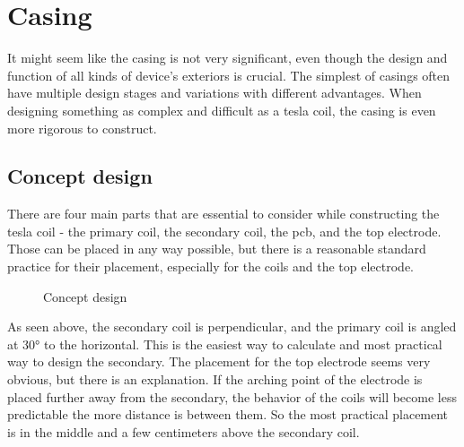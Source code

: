 \chapter{Casing}


It might seem like the casing is not very significant, even though the design and function of all kinds of device's exteriors is crucial. The simplest of casings often have multiple design stages and variations with different advantages. When designing something as complex and difficult as a tesla coil, the casing is even more rigorous to construct. 


\section{Concept design}
\label{sec:concept-design}

There are four main parts that are essential to consider while constructing the tesla coil - the primary coil, the secondary coil, the \gls{pcb}, and the top electrode. Those can be placed in any way possible, but there is a reasonable standard practice for their placement, especially for the coils and the top electrode. 

\begin{figure}
    \centering
    \caption{Concept design}
    \label{BD-envision}
\end{figure}

As seen above, the secondary coil is perpendicular, and the primary coil is angled at 30° to the horizontal. This is the easiest way to calculate and most practical way to design the secondary. The placement for the top electrode seems very obvious, but there is an explanation. If the arching point of the electrode is placed further away from the secondary, the behavior of the coils will become less predictable the more distance is between them. So the most practical placement is in the middle and a few centimeters above the secondary coil.

